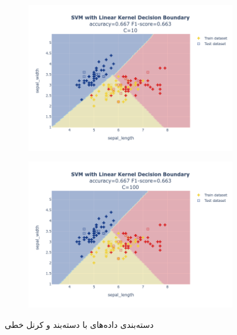 \documentclass{article}
\begin{document}
\begin{figure}
\begin{subfigure}{0.3\textwidth}
        \includegraphics[scale=.13]{images/implementation/q1/linear_kernel/sepal_length_sepal_width_10.png}
    \end{subfigure}
    \newline
    \begin{subfigure}{0.3\textwidth}
        \centering
        \includegraphics[scale=.13]{images/implementation/q1/linear_kernel/sepal_length_sepal_width_100.png}
    \end{subfigure}
    \caption{دسته‌بندی داده‌های  با دسته‌بند  و کرنل خطی}
    \label{linear_kernel}
\end{figure}

\newpage
\end{document}
